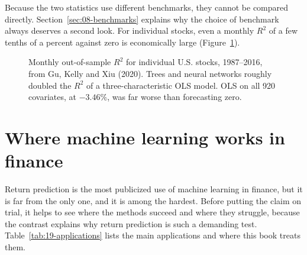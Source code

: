 Because the two statistics use different benchmarks, they cannot be compared directly. Section~\ref{sec:08-benchmarks} explains why the choice of benchmark always deserves a second look. For individual stocks, even a monthly $R^2$ of a few tenths of a percent against zero is economically large (Figure~\ref{fig:19-gkx}).

\begin{figure}[htbp]
\centering
{}
\caption{Monthly out-of-sample $R^2$ for individual U.S. stocks, 1987--2016, from Gu, Kelly and Xiu (2020). Trees and neural networks roughly doubled the $R^2$ of a three-characteristic OLS model. OLS on all 920 covariates, at $-3.46\%$, was far worse than forecasting zero.}
\label{fig:19-gkx}
\end{figure}


\section{Where machine learning works in finance}
\label{sec:19-applications}

Return prediction is the most publicized use of machine learning in finance, but it is far from the only one, and it is among the hardest. Before putting the claim on trial, it helps to see where the methods succeed and where they struggle, because the contrast explains why return prediction is such a demanding test. Table~\ref{tab:19-applications} lists the main applications and where this book treats them.

